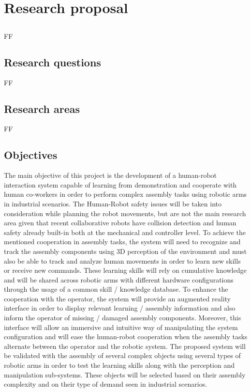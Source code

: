 \chapter{Research proposal}\label{chap:research-proposal}



\section*{}

FF



\section{Research questions}

FF


\section{Research areas}

FF


\section{Objectives}

The main objective of this project is the development of a human-robot interaction system capable of learning from demonstration and cooperate with human co-workers in order to perform complex assembly tasks using robotic arms in industrial scenarios. The Human-Robot safety issues will be taken into consideration while planning the robot movements, but are not the main research area given that recent collaborative robots have collision detection and human safety already built-in both at the mechanical and controller level.
To achieve the mentioned cooperation in assembly tasks, the system will need to recognize and track the assembly components using 3D perception of the environment and must also be able to track and analyze human movements in order to learn new skills or receive new commands. These learning skills will rely on cumulative knowledge and will be shared across robotic arms with different hardware configurations through the usage of a common skill / knowledge database.
To enhance the cooperation with the operator, the system will provide an augmented reality interface in order to display relevant learning / assembly information and also inform the operator of missing / damaged assembly components. Moreover, this interface will allow an immersive and intuitive way of manipulating the system configuration and will ease the human-robot cooperation when the assembly tasks alternate between the operator and the robotic system.
The proposed system will be validated with the assembly of several complex objects using several types of robotic arms in order to test the learning skills along with the perception and manipulation sub-systems. These objects will be selected based on their assembly complexity and on their type of demand seen in industrial scenarios.



